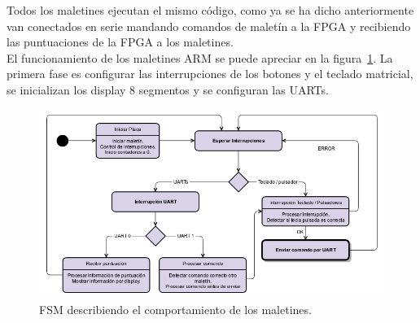 Todos los maletines ejecutan el mismo código, como ya se ha dicho
anteriormente van conectados en serie mandando comandos de maletín a
la FPGA y recibiendo las puntuaciones de la FPGA a los maletines. \\

El funcionamiento de los maletines ARM se puede apreciar en la
figura~\ref{s3:fig:FSM_maletin}. La primera fase es configurar las
interrupciones de los botones y el teclado matricial, se inicializan
los display 8 segmentos y se configuran las UARTs. \\


\begin{figure}[h]
  \centering
  \includegraphics[width=1.0\textwidth]{images/maletin_fsm.png}
  \caption{FSM describiendo el comportamiento de los maletines.}
  \label{s3:fig:FSM_maletin}
\end{figure}





%
%


